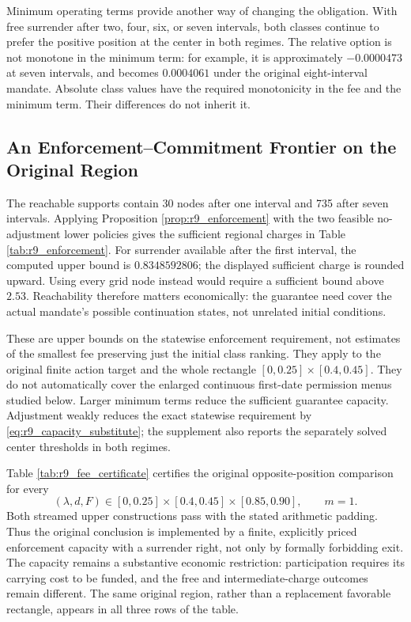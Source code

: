 Minimum operating terms provide another way of changing the obligation. With free surrender after two, four, six, or seven intervals, both classes continue to prefer the positive position at the center in both regimes. The relative option is not monotone in the minimum term: for example, it is approximately $-0.0000473$ at seven intervals, and becomes $0.0004061$ under the original eight-interval mandate. Absolute class values have the required monotonicity in the fee and the minimum term. Their differences do not inherit it.

\subsection{An Enforcement--Commitment Frontier on the Original Region}

The reachable supports contain 30 nodes after one interval and 735 after seven intervals. Applying Proposition \ref{prop:r9_enforcement} with the two feasible no-adjustment lower policies gives the sufficient regional charges in Table \ref{tab:r9_enforcement}. For surrender available after the first interval, the computed upper bound is $0.8348592806$; the displayed sufficient charge is rounded upward. Using every grid node instead would require a sufficient bound above $2.53$. Reachability therefore matters economically: the guarantee need cover the actual mandate's possible continuation states, not unrelated initial conditions.

These are upper bounds on the statewise enforcement requirement, not estimates of the smallest fee preserving just the initial class ranking. They apply to the original finite action target and the whole rectangle $[0,0.25]\times[0.4,0.45]$. They do not automatically cover the enlarged continuous first-date permission menus studied below. Larger minimum terms reduce the sufficient guarantee capacity. Adjustment weakly reduces the exact statewise requirement by \eqref{eq:r9_capacity_substitute}; the supplement also reports the separately solved center thresholds in both regimes.


Table \ref{tab:r9_fee_certificate} certifies the original opposite-position comparison for every
\begin{equation}
 (\lambda,d,F)\in[0,0.25]\times[0.4,0.45]\times[0.85,0.90],\qquad m=1.
 \label{eq:r9_fee_box}
\end{equation}
Both streamed upper constructions pass with the stated arithmetic padding. Thus the original conclusion is implemented by a finite, explicitly priced enforcement capacity with a surrender right, not only by formally forbidding exit. The capacity remains a substantive economic restriction: participation requires its carrying cost to be funded, and the free and intermediate-charge outcomes remain different. The same original region, rather than a replacement favorable rectangle, appears in all three rows of the table.

